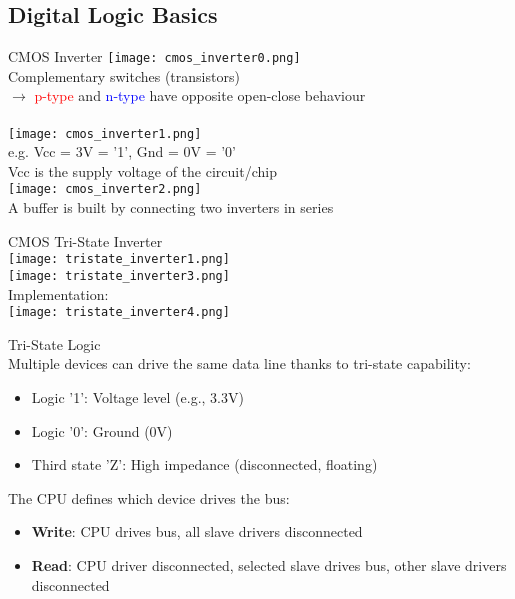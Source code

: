 \multend


\subsection{Digital Logic Basics}


\begin{definition}{CMOS Inverter}
    \texttt{[image: cmos\_inverter0.png]}\\
    Complementary switches (transistors)\\
    $\rightarrow$ \textcolor{red}{p-type} and \textcolor{blue}{n-type} have opposite open-close behaviour\\
    \\
    \texttt{[image: cmos\_inverter1.png]}\\
    e.g. Vcc = 3V = '1', Gnd = 0V = '0'\\
    Vcc is the supply voltage of the circuit/chip
    \vspace{2mm}\\
    \texttt{[image: cmos\_inverter2.png]}\\
    A buffer is built by connecting two inverters in series
\end{definition}

\begin{definition}{CMOS Tri-State Inverter}\\
    \texttt{[image: tristate\_inverter1.png]}\\
    \texttt{[image: tristate\_inverter3.png]}\\
    Implementation:\\
    \texttt{[image: tristate\_inverter4.png]}
\end{definition}

\begin{definition}{Tri-State Logic}\\
Multiple devices can drive the same data line thanks to tri-state capability:
\begin{itemize}
    \item Logic '1': Voltage level (e.g., 3.3V)
    \item Logic '0': Ground (0V)
    \item Third state 'Z': High impedance (disconnected, floating)
\end{itemize}
The CPU defines which device drives the bus:
\begin{itemize}
    \item \textbf{Write}: CPU drives bus, all slave drivers disconnected
    \item \textbf{Read}: CPU driver disconnected, selected slave drives bus, other slave drivers disconnected
\end{itemize}
\end{definition}


